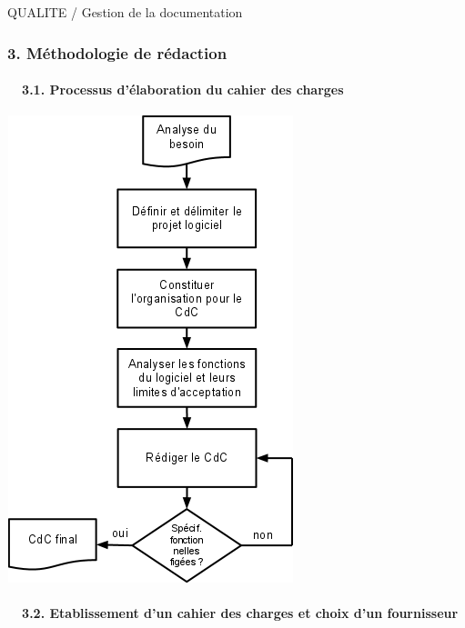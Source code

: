 \documentclass{article}
\begin{document}
QUALITE / Gestion de la documentation


\bigskip

\subsubsection[3. Méthodologie de rédaction]{3. Méthodologie de
rédaction}

\bigskip

\paragraph[\ \ 3.1. Processus d’élaboration du cahier des
charges]{\ \ 3.1. Processus d’élaboration du cahier des charges}

\includegraphics[width=8.308cm,height=13.6cm]{BP22020Aide20C3A020la20rC3A9daction20dun20CdC20Logiciel-img1.png}



\bigskip


\bigskip

\paragraph[\ \ 3.2. Etablissement d’un cahier des charges et choix d’un
fournisseur]{\ \ 3.2. Etablissement d’un cahier des charges et choix
d’un fournisseur}
\end{document}

